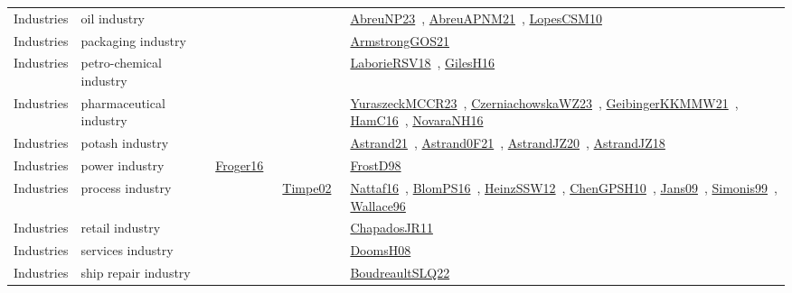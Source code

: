 {\begin{longtable}{lp{3cm}>{\raggedright\arraybackslash}p{6cm}>{\raggedright\arraybackslash}p{6cm}>{\raggedright\arraybackslash}p{8cm}}
Industries & oil industry &  &  & \href{works/AbreuNP23.pdf}{AbreuNP23}~\cite{AbreuNP23}, \href{works/AbreuAPNM21.pdf}{AbreuAPNM21}~\cite{AbreuAPNM21}, \href{works/LopesCSM10.pdf}{LopesCSM10}~\cite{LopesCSM10}\\
Industries & packaging industry &  &  & \href{works/ArmstrongGOS21.pdf}{ArmstrongGOS21}~\cite{ArmstrongGOS21}\\
Industries & petro-chemical industry &  &  & \href{works/LaborieRSV18.pdf}{LaborieRSV18}~\cite{LaborieRSV18}, \href{works/GilesH16.pdf}{GilesH16}~\cite{GilesH16}\\
Industries & pharmaceutical industry &  &  & \href{works/YuraszeckMCCR23.pdf}{YuraszeckMCCR23}~\cite{YuraszeckMCCR23}, \href{works/CzerniachowskaWZ23.pdf}{CzerniachowskaWZ23}~\cite{CzerniachowskaWZ23}, \href{works/GeibingerKKMMW21.pdf}{GeibingerKKMMW21}~\cite{GeibingerKKMMW21}, \href{works/HamC16.pdf}{HamC16}~\cite{HamC16}, \href{works/NovaraNH16.pdf}{NovaraNH16}~\cite{NovaraNH16}\\
Industries & potash industry &  &  & \href{works/Astrand21.pdf}{Astrand21}~\cite{Astrand21}, \href{works/Astrand0F21.pdf}{Astrand0F21}~\cite{Astrand0F21}, \href{works/AstrandJZ20.pdf}{AstrandJZ20}~\cite{AstrandJZ20}, \href{works/AstrandJZ18.pdf}{AstrandJZ18}~\cite{AstrandJZ18}\\
Industries & power industry & \href{works/Froger16.pdf}{Froger16}~\cite{Froger16} &  & \href{works/FrostD98.pdf}{FrostD98}~\cite{FrostD98}\\
Industries & process industry &  & \href{works/Timpe02.pdf}{Timpe02}~\cite{Timpe02} & \href{works/Nattaf16.pdf}{Nattaf16}~\cite{Nattaf16}, \href{works/BlomPS16.pdf}{BlomPS16}~\cite{BlomPS16}, \href{works/HeinzSSW12.pdf}{HeinzSSW12}~\cite{HeinzSSW12}, \href{works/ChenGPSH10.pdf}{ChenGPSH10}~\cite{ChenGPSH10}, \href{works/Jans09.pdf}{Jans09}~\cite{Jans09}, \href{works/Simonis99.pdf}{Simonis99}~\cite{Simonis99}, \href{works/Wallace96.pdf}{Wallace96}~\cite{Wallace96}\\
Industries & retail industry &  &  & \href{works/ChapadosJR11.pdf}{ChapadosJR11}~\cite{ChapadosJR11}\\
Industries & services industry &  &  & \href{works/DoomsH08.pdf}{DoomsH08}~\cite{DoomsH08}\\
Industries & ship repair industry &  &  & \href{works/BoudreaultSLQ22.pdf}{BoudreaultSLQ22}~\cite{BoudreaultSLQ22}\\

\end{longtable}}
